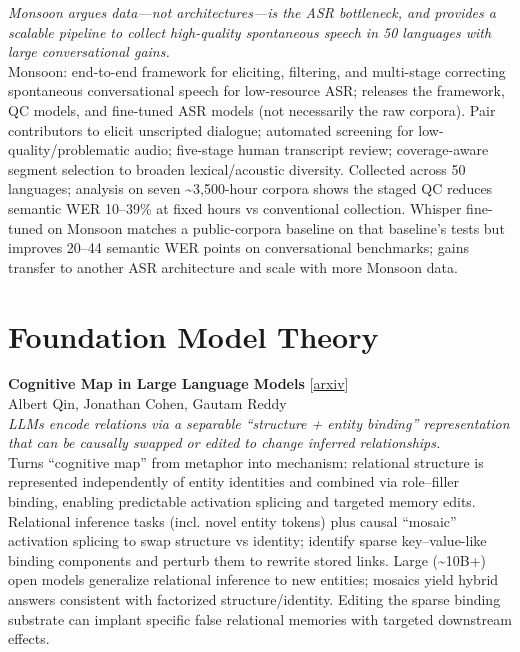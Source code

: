 \documentclass[12pt,letterpaper]{article}
\begin{document}
{\small\textit{Monsoon argues data---not architectures---is the ASR bottleneck, and provides a scalable pipeline to collect high-quality spontaneous speech in 50 languages with large conversational gains.}}\\[1pt]
{\footnotesize Monsoon: end-to-end framework for eliciting, filtering, and multi-stage correcting spontaneous conversational speech for low-resource ASR; releases the framework, QC models, and fine-tuned ASR models (not necessarily the raw corpora). Pair contributors to elicit unscripted dialogue; automated screening for low-quality/problematic audio; five-stage human transcript review; coverage-aware segment selection to broaden lexical/acoustic diversity. Collected across 50 languages; analysis on seven \textasciitilde{}3,500-hour corpora shows the staged QC reduces semantic WER 10--39\% at fixed hours vs conventional collection. Whisper fine-tuned on Monsoon matches a public-corpora baseline on that baseline's tests but improves 20--44 semantic WER points on conversational benchmarks; gains transfer to another ASR architecture and scale with more Monsoon data.}

\medskip


\section*{Foundation Model Theory}

{\small\textbf{Cognitive Map in Large Language Models}} {\scriptsize[\href{https://arxiv.org/abs/2610.25596}{arxiv}]}\\
{\scriptsize Albert Qin, Jonathan Cohen, Gautam Reddy}\\

{\small\textit{LLMs encode relations via a separable ``structure + entity binding'' representation that can be causally swapped or edited to change inferred relationships.}}\\[1pt]
{\footnotesize Turns ``cognitive map'' from metaphor into mechanism: relational structure is represented independently of entity identities and combined via role--filler binding, enabling predictable activation splicing and targeted memory edits. Relational inference tasks (incl. novel entity tokens) plus causal ``mosaic'' activation splicing to swap structure vs identity; identify sparse key--value-like binding components and perturb them to rewrite stored links. Large (\textasciitilde{}10B+) open models generalize relational inference to new entities; mosaics yield hybrid answers consistent with factorized structure/identity. Editing the sparse binding substrate can implant specific false relational memories with targeted downstream effects.}
\end{document}
